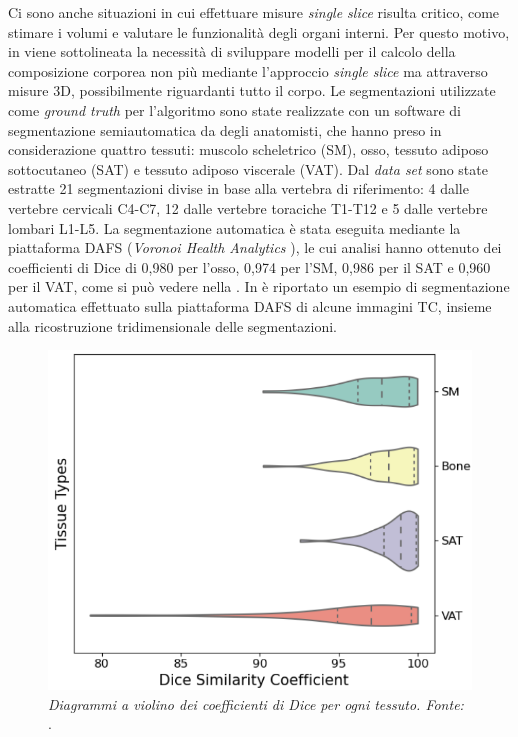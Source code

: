 Ci sono anche situazioni in cui effettuare misure \textit{single slice} risulta critico, come stimare i volumi e valutare le funzionalità degli organi interni. Per questo motivo, in \cite{Ma2021} viene sottolineata la necessità di sviluppare modelli per il calcolo della composizione corporea non più mediante l’approccio \textit{single slice} ma attraverso misure 3D, possibilmente riguardanti tutto il corpo. Le segmentazioni utilizzate come \textit{ground truth} per l’algoritmo sono state realizzate con un software di segmentazione semiautomatica da degli anatomisti, che hanno preso in considerazione quattro tessuti: muscolo scheletrico (SM), osso, tessuto adiposo sottocutaneo (SAT) e tessuto adiposo viscerale (VAT). Dal \textit{data set} sono state estratte 21 segmentazioni divise in base alla vertebra di riferimento: 4 dalle vertebre cervicali C4-C7, 12 dalle vertebre toraciche T1-T12 e 5 dalle vertebre lombari L1-L5. La segmentazione automatica è stata eseguita mediante la piattaforma DAFS (\textit{Voronoi Health Analytics} \cite{voronoi}), le cui analisi hanno ottenuto dei coefficienti di Dice di 0,980 per l’osso, 0,974 per l’SM, 0,986 per il SAT e 0,960 per il VAT, come si può vedere nella . In  è riportato un esempio di segmentazione automatica effettuato sulla piattaforma DAFS di alcune immagini TC, insieme alla ricostruzione tridimensionale delle segmentazioni.
\begin{figure}[htp]
\centering
\includegraphics[scale=0.75]{Immagini/ma_dice.png}
\caption{\label{fig:ma_dice} \textit{Diagrammi a violino dei coefficienti di Dice per ogni tessuto. Fonte:} \cite{Ma2021}.}
\end{figure}
